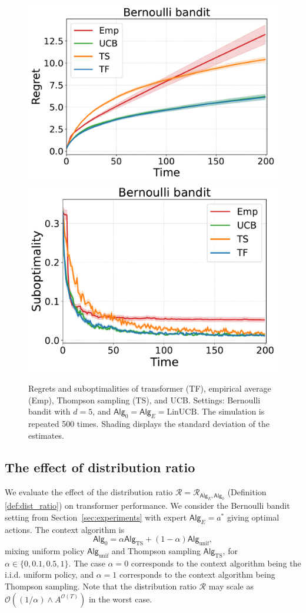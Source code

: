 \documentclass[10pt]{article}
\renewcommand{\cO}{\mathcal{O}}
\newcommand{\<}{\left\langle}
\renewcommand{\>}{\right\rangle}
\newcommand{\LinUCB}{{\mathrm{LinUCB}}}
\newcommand{\unif}{{\mathrm{unif}}}
\newcommand{\TS}{{\mathrm{TS}}}
\newcommand{\action}{{a}}
\newcommand{\totlen}{{T}}
\newcommand{\sAlg}{{\mathsf{Alg}}}
\newcommand{\osAlg}{\overline{\mathsf{Alg}}}
\newcommand{\shortexp}{{E}}
\newcommand{\distratio}{{\mathcal{R}}}
\newcommand{\Numact}{{A}}
\begin{document}
\begin{figure}[ht]
\centering
\includegraphics[width=0.47\linewidth]{Sections/figs/record_3_cum_True.pdf}
\includegraphics[width=0.45\linewidth]{Sections/figs/record_3_cum_False.pdf}
\caption{Regrets and suboptimalities of transformer (TF), empirical average (Emp), Thompson sampling (TS), and  UCB. Settings: Bernoulli bandit with $d=5$, and $\sAlg_0=\sAlg_\shortexp=\LinUCB$.
The simulation is repeated 500 times. Shading displays the standard deviation of the estimates. }
\label{fig:linucb_bernoulli}
\end{figure}

\subsection{The effect of distribution ratio}

We evaluate the effect of the distribution ratio $\distratio=\distratio_{\osAlg_{\shortexp},\sAlg_0}$ (Definition \ref{def:dist_ratio}) on transformer performance. We consider the Bernoulli bandit setting from Section~\ref{sec:experiments} with expert $\sAlg_\shortexp=\action^*$ giving optimal actions. The context algorithm is $$\sAlg_0=\alpha\sAlg_{\TS}+(1-\alpha)\sAlg_{\unif},$$
mixing uniform policy $\sAlg_{\unif}$ and Thompson sampling $\sAlg_{\TS}$, for $\alpha\in\{0,0.1,0.5,1\}$. The case $\alpha=0$ corresponds to the context algorithm being the i.i.d. uniform policy, and  $\alpha=1$ corresponds to the context algorithm being Thompson sampling. Note that the distribution ratio $\distratio$ may scale as $\cO((1/\alpha)\wedge \Numact^{\cO(\totlen)})$ in the worst case.
\end{document}
